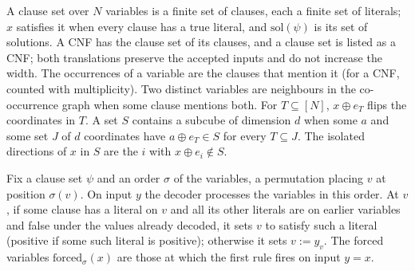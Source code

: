\begin{definition}
  \label{def:lowerbounds-clause-sets}
  \leanok
  A clause set over $N$ variables is a finite set of clauses, each a finite set
  of literals; $x$ satisfies it when every clause has a true literal, and
  $\mathrm{sol}(\psi)$ is its set of solutions. A CNF has the clause set of its
  clauses, and a clause set is listed as a CNF; both translations preserve the
  accepted inputs and do not increase the width. The occurrences of a variable
  are the clauses that mention it (for a CNF, counted with multiplicity). Two
  distinct variables are neighbours in the co-occurrence graph when some clause
  mentions both. For $T\subseteq[N]$, $x\oplus e_T$ flips the coordinates in
  $T$. A set $S$ contains a subcube of dimension $d$ when some $a$ and some set
  $J$ of $d$ coordinates have $a\oplus e_T\in S$ for every $T\subseteq J$. The
  isolated directions of $x$ in $S$ are the $i$ with $x\oplus e_i\notin S$.
\end{definition}

\begin{definition}
  \label{def:lowerbounds-ppz-decoder}
  \leanok
  Fix a clause set $\psi$ and an order $\sigma$ of the variables, a permutation
  placing $v$ at position $\sigma(v)$. On input $y$ the decoder processes the
  variables in this order. At $v$, if some clause has a literal on $v$ and all
  its other literals are on earlier variables and false under the values already
  decoded, it sets $v$ to satisfy such a literal (positive if some such literal is
  positive); otherwise it sets $v := y_v$. The forced variables
  $\mathrm{forced}_\sigma(x)$ are those at which the first rule fires on input
  $y = x$.
\end{definition}

